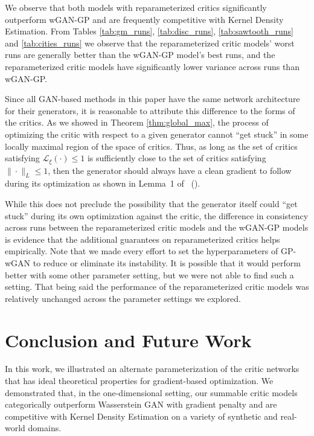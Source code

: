 \documentclass[letterpaper]{article} %
\newcommand{\namecite}[1]{\citeauthor{#1}~(\citeyear{#1})}
\begin{document}
We observe that both models with reparameterized critics significantly outperform wGAN-GP and are frequently competitive with Kernel Density Estimation. From Tables \ref{tab:gm_runs}, \ref{tab:disc_runs}, \ref{tab:sawtooth_runs} and \ref{tab:cities_runs} we observe that the  reparameterized critic models' worst runs are generally better than the wGAN-GP model's best runs, and the reparameterized critic models have significantly lower variance across runs than wGAN-GP.

Since all GAN-based methods in this paper have the same network architecture for their generators, it is reasonable to attribute this difference to the forms of the critics. As we showed in Theorem \ref{thm:global_max}, the process of optimizing the critic with respect to a given generator cannot ``get stuck'' in some locally maximal region of the space of critics. Thus, as long as the set of critics satisfying $\mathcal{L}_\xi(\cdot) \leq 1$ is sufficiently close to the set of critics satisfying $\| \cdot \|_L \leq 1$, then the generator should always have a clean gradient to follow during its optimization as shown in Lemma~1 of \namecite{Gulrajani2017ImprovedTO}.

While this does not preclude the possibility that the generator itself could ``get stuck'' during its own optimization against the critic, the difference in consistency across runs between the reparameterized critic models and the wGAN-GP models is evidence that the additional guarantees on reparameterized critics helps empirically. Note that we made every effort to set the hyperparameters of GP-wGAN to reduce or eliminate its instability. It is possible that it would perform better with some other parameter setting, but we were not able to find such a setting. That being said the performance of the reparameterized critic models was relatively unchanged across the parameter settings we explored.

\section{Conclusion and Future Work}
In this work, we illustrated an alternate parameterization of the critic networks that has ideal theoretical properties for gradient-based optimization. We demonstrated that, in the one-dimensional setting, our summable critic models categorically outperform Wasserstein GAN with gradient penalty and are competitive with Kernel Density Estimation on a variety of synthetic and real-world domains.
\end{document}
